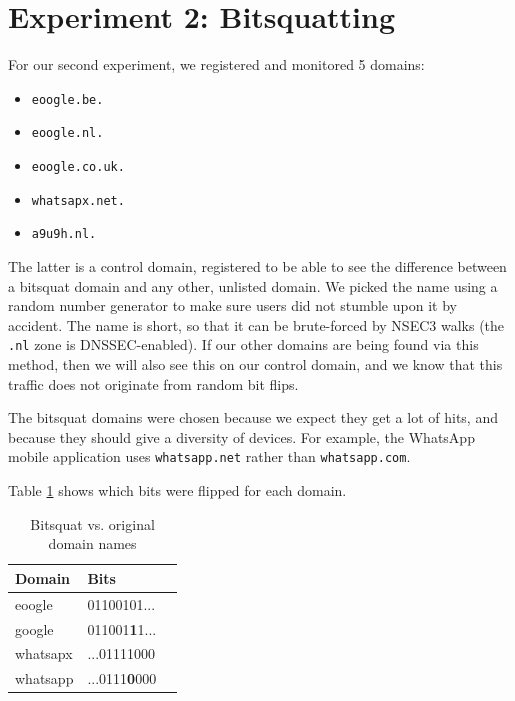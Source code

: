 \documentclass[conference]{IEEEtran}
\begin{document}
\section{Experiment 2: Bitsquatting}

For our second experiment, we registered and monitored 5 domains:

\begin{itemize}
  \item \texttt{eoogle.be.}
  \item \texttt{eoogle.nl.}
  \item \texttt{eoogle.co.uk.}
  \item \texttt{whatsapx.net.}
  \item \texttt{a9u9h.nl.}
\end{itemize}

The latter is a control domain, registered to be able to see the difference
between a bitsquat domain and any other, unlisted domain. We picked the
name using a random number generator to make sure users did not stumble upon it
by accident. The name is short, so that it can be brute-forced by NSEC3 walks
(the \texttt{.nl} zone is DNSSEC-enabled). If our other domains are being found
via this method, then we will also see this on our control domain, and we know
that this traffic does not originate from random bit flips.

The bitsquat domains were chosen because we expect they get a lot of hits, and
because they should give a diversity of devices. For example, the WhatsApp
mobile application uses \texttt{whatsapp.net} rather than
\texttt{whatsapp.com}.

Table \ref{tab:bits} shows which bits were flipped for each domain.

\begin{table}[H]
  \centering
  \caption{Bitsquat vs. original domain names}
  \label{tab:bits}
  \begin{tabular}{|l|l|l|}
    \hline
    \textbf{Domain}   & \textbf{Bits} \\ \hline
    eoogle   & 01100101... \\ \hline
    google   & 011001\textbf{1}1... \\ \hline
    whatsapx & ...01111000 \\ \hline
    whatsapp & ...0111\textbf{0}000 \\ \hline
   \end{tabular}
\end{table}
\end{document}
